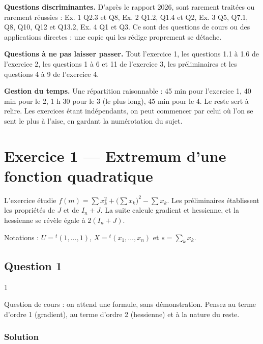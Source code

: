\documentclass[11pt,a4paper]{article}
\begin{document}
\textbf{Questions discriminantes.} D'après le rapport 2026, sont rarement traitées ou rarement réussies : Ex. 1 Q2.3 et Q8, Ex. 2 Q1.2, Q1.4 et Q2, Ex. 3 Q5, Q7.1, Q8, Q10, Q12 et Q13.2, Ex. 4 Q1 et Q3. Ce sont des questions de cours ou des applications directes : une copie qui les rédige proprement se détache.

\textbf{Questions à ne pas laisser passer.} Tout l'exercice 1, les questions 1.1 à 1.6 de l'exercice 2, les questions 1 à 6 et 11 de l'exercice 3, les préliminaires et les questions 4 à 9 de l'exercice 4.

\textbf{Gestion du temps.} Une répartition raisonnable : 45 min pour l'exercice 1, 40 min pour le 2, 1 h 30 pour le 3 (le plus long), 45 min pour le 4. Le reste sert à relire. Les exercices étant indépendants, on peut commencer par celui où l'on se sent le plus à l'aise, en gardant la numérotation du sujet.

\hypertarget{exercice-1-extremum-dune-fonction-quadratique}{%
\section{Exercice 1 --- Extremum d'une fonction quadratique}\label{exercice-1-extremum-dune-fonction-quadratique}}

L'exercice étudie \(f(m)=\sum x_k^2+\bigl(\sum x_k\bigr)^2-\sum x_k\). Les préliminaires établissent les propriétés de \(J\) et de \(I_n+J\). La suite calcule gradient et hessienne, et la hessienne se révèle égale à \(2(I_n+J)\).

Notations : \(U={}^t(1,\dots,1)\), \(X={}^t(x_1,\dots,x_n)\) et \(s=\sum_kx_k\).

\hypertarget{question-1}{%
\subsection{Question 1}\label{question-1}}

\begin{indication}{1}

Question de cours : on attend une formule, sans démonstration. Pensez au terme d'ordre 1 (gradient), au terme d'ordre 2 (hessienne) et à la nature du reste.

\end{indication}

\hypertarget{solution}{%
\subsubsection{Solution}\label{solution}}
\end{document}
